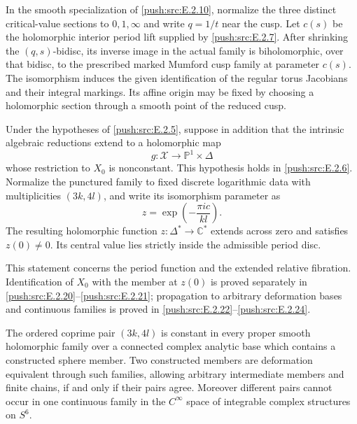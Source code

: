 \begin{proposition}\hypertarget{tag-0336}{}\label{push:src:E.2.20}


In the smooth specialization of \ref{push:src:E.2.10}, normalize
the three distinct critical-value sections to
$0,1,\infty$ and write $q=1/t$ near the cusp.
Let $c(s)$ be the holomorphic interior period
lift supplied by \ref{push:src:E.2.7}.  After shrinking the
$(q,s)$-bidisc, its inverse image in the actual
family is biholomorphic, over that bidisc, to
the prescribed marked Mumford cusp family at
parameter $c(s)$.  The isomorphism induces
the given identification of the regular
torus Jacobians and their integral markings.
Its affine origin may be fixed by choosing
a holomorphic section through a smooth
point of the reduced cusp.
\end{proposition}

\begin{proposition}\hypertarget{tag-033F}{}\label{push:src:E.2.7}


Under the hypotheses of \ref{push:src:E.2.5}, suppose in addition that the
intrinsic algebraic reductions extend to a holomorphic map
\[
 g:\mathcal X\longrightarrow\mathbb P^1\times\Delta
\]
whose restriction to $X_0$ is nonconstant.  This hypothesis
holds in \ref{push:src:E.2.6}.  Normalize the punctured family to fixed
discrete logarithmic data with multiplicities $(3k,4l)$, and
write its isomorphism parameter as
\[
 z=\exp\!\left(-\frac{\pi i c}{kl}\right).
\]
The resulting holomorphic function $z:\Delta^*\to\mathbb C^*$
extends across zero and satisfies $z(0)\ne0$.  Its central
value lies strictly inside the admissible period disc.

This statement concerns the period function and the extended
relative fibration.  Identification of $X_0$ with the member
at $z(0)$ is proved separately in \ref{push:src:E.2.20}--\ref{push:src:E.2.21}; propagation
to arbitrary deformation bases and continuous families is
proved in \ref{push:src:E.2.22}--\ref{push:src:E.2.24}.
\end{proposition}

\begin{corollary}\hypertarget{tag-033C}{}\label{push:src:E.2.4}


The ordered coprime pair $(3k,4l)$ is constant in every
proper smooth holomorphic family over a connected complex
analytic base which contains a constructed sphere member.
Two constructed members are deformation equivalent through
such families, allowing arbitrary intermediate members and
finite chains, if and only if their pairs agree.
Moreover different pairs cannot occur in one continuous
family in the $C^\infty$ space of integrable complex
structures on $S^6$.
\end{corollary}


